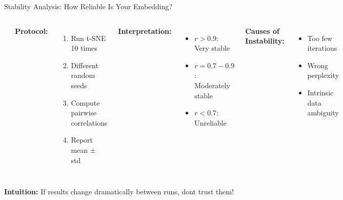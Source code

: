 \documentclass[aspectratio=169]{beamer}
\newcommand{\intuition}[1]{\colorbox{green!10}{\textcolor{intuitioncolor}{\textbf{Intuition:} #1}}}
\begin{document}
\begin{frame}{Stability Analysis: How Reliable Is Your Embedding?}
\begin{columns}
\includegraphics[width=0.5\textwidth]{./Figures/stability_analysis.png}

\textbf{Protocol:}
\begin{enumerate}
\item Run t-SNE 10 times
\item Different random seeds
\item Compute pairwise correlations
\item Report mean ± std
\end{enumerate}

\textbf{Interpretation:}
\begin{itemize}
\item $r > 0.9$: Very stable
\item $r = 0.7-0.9$: Moderately stable
\item $r < 0.7$: Unreliable
\end{itemize}

\textbf{Causes of Instability:}
\begin{itemize}
\item Too few iterations
\item Wrong perplexity
\item Intrinsic data ambiguity
\end{itemize}
\end{columns}

\intuition{If results change dramatically between runs, dont trust them!}
\end{frame}
\end{document}
